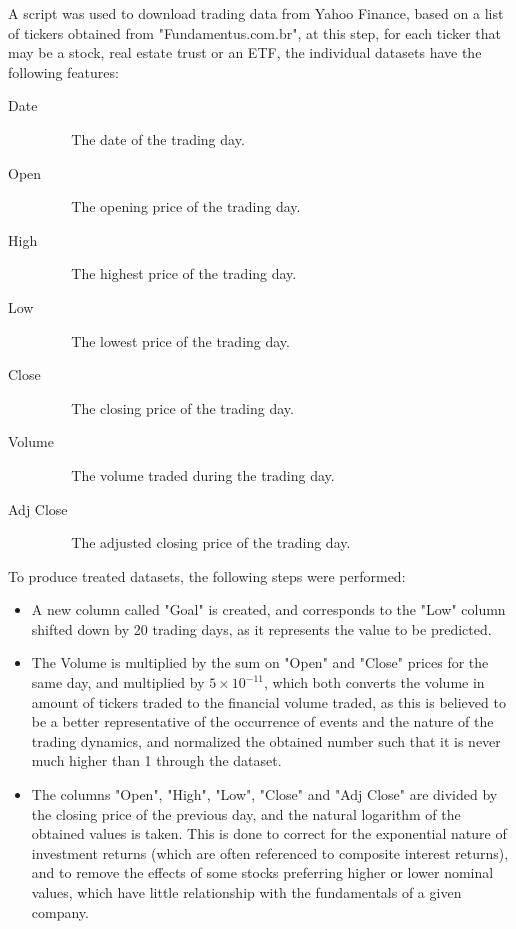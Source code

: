 \documentclass[conference]{IEEEtran}
\begin{document}
A script was used to download trading data from Yahoo Finance, based on a list of tickers obtained from "Fundamentus.com.br", at this step, for each ticker that may be a stock, real estate trust or an ETF, the individual datasets have the following features:
\begin{description}
    \item[Date] $\,\,\,\,\,\,\,\,$ The date of the trading day.
    \item[Open] $\,\,\,\,\,\,\,\,$ The opening price of the trading day.
    \item[High] $\,\,\,\,\,\,\,\,$ The highest price of the trading day.
    \item[Low] $\,\,\,\,\,\,\,\,$ The lowest price of the trading day.
    \item[Close] $\,\,\,\,\,\,\,\,$ The closing price of the trading day.
    \item[Volume] $\,\,\,\,\,\,\,\,$ The volume traded during the trading day.
    \item[Adj Close] $\,\,\,\,\,\,\,\,$ The adjusted closing price of the trading day.     
\end{description}

To produce treated datasets, the following steps were performed:

\begin{itemize}
    \item A new column called "Goal" is created, and corresponds to the "Low" column shifted down by 20 trading days, as it represents the value to be predicted.
    \item The Volume is multiplied by the sum on "Open" and "Close" prices for the same day, and multiplied by $5\times 10^{-11}$, which both converts the volume in amount of tickers traded to the financial volume traded, as this is believed to be a better representative of the occurrence of events and the nature of the trading dynamics, and normalized the obtained number such that it is never much higher than 1 through the dataset.
    \item The columns "Open", "High", "Low", "Close" and "Adj Close" are divided by the closing price of the previous day, and the natural logarithm of the obtained values is taken. This is done to correct for the exponential nature of investment returns (which are often referenced to composite interest returns), and to remove the effects of some stocks preferring higher or lower nominal values, which have little relationship with the fundamentals of a given company.
\end{itemize}
\end{document}
